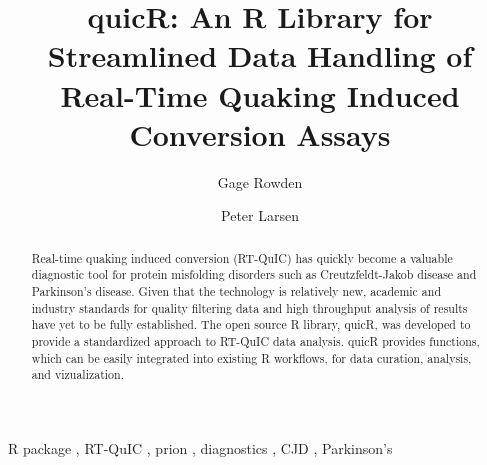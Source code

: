 \documentclass[preprint,12pt, a4paper]{elsarticle}
\begin{document}
\renewcommand{\labelenumii}{\arabic{enumi}.\arabic{enumii}}

\begin{frontmatter}

 


\title{quicR: An R Library for Streamlined Data Handling of Real-Time Quaking Induced Conversion Assays}

\author[label1,label2,label3]{Gage Rowden}
\author[label1,label2,label3]{Peter Larsen}
\address[label1]{Department of Veterinary and Biomedical Sciences, University of Minnesota, USA.}
\address[label2]{Minnesota Center for Prion Research and Outreach, University of Minnesota, USA.}
\address[label3]{Priogen Corp., USA.}

\begin{abstract}
Real-time quaking induced conversion (RT-QuIC) has quickly become a valuable diagnostic tool for protein misfolding disorders such as Creutzfeldt-Jakob disease and Parkinson's disease. Given that the technology is relatively new, academic and industry standards for quality filtering data and high throughput analysis of results have yet to be fully established. The open source R library, quicR, was developed to provide a standardized approach to RT-QuIC data analysis. quicR provides functions, which can be easily integrated into existing R workflows, for data curation, analysis, and vizualization.
\end{abstract}

\begin{keyword}
R package \sep{} RT-QuIC \sep{} prion \sep{} diagnostics \sep{} CJD \sep{} Parkinson's



\end{keyword}

\end{frontmatter}
\end{document}
